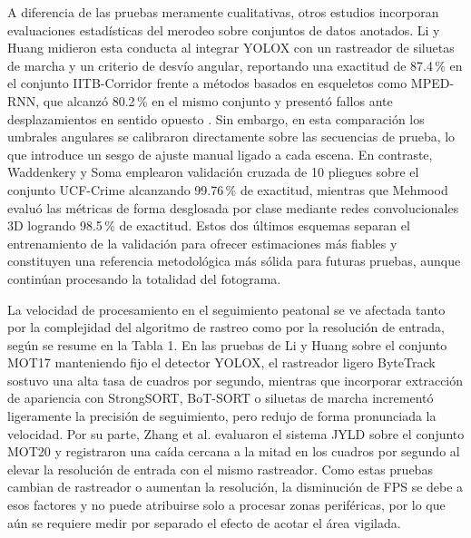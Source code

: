 \documentclass[runningheads]{llncs}
\begin{document}
A diferencia de las pruebas meramente cualitativas, otros estudios incorporan evaluaciones estadísticas del merodeo sobre conjuntos de datos anotados. Li y Huang \cite{li2024} midieron esta conducta al integrar YOLOX con un rastreador de siluetas de marcha y un criterio de desvío angular, reportando una exactitud de 87.4\,\% en el conjunto IITB-Corridor frente a métodos basados en esqueletos como MPED-RNN, que alcanzó 80.2\,\% en el mismo conjunto y presentó fallos ante desplazamientos en sentido opuesto \cite{jiang2022,li2024}. Sin embargo, en esta comparación los umbrales angulares se calibraron directamente sobre las secuencias de prueba, lo que introduce un sesgo de ajuste manual ligado a cada escena. En contraste, Waddenkery y Soma \cite{waddenkery2024} emplearon validación cruzada de 10 pliegues sobre el conjunto UCF-Crime alcanzando 99.76\,\% de exactitud, mientras que Mehmood \cite{mehmood2021} evaluó las métricas de forma desglosada por clase mediante redes convolucionales 3D logrando 98.5\,\% de exactitud. Estos dos últimos esquemas separan el entrenamiento de la validación para ofrecer estimaciones más fiables y constituyen una referencia metodológica más sólida para futuras pruebas, aunque continúan procesando la totalidad del fotograma.

La velocidad de procesamiento en el seguimiento peatonal se ve afectada tanto por la complejidad del algoritmo de rastreo como por la resolución de entrada, según se resume en la Tabla 1. En las pruebas de Li y Huang \cite{li2024} sobre el conjunto MOT17 manteniendo fijo el detector YOLOX, el rastreador ligero ByteTrack sostuvo una alta tasa de cuadros por segundo, mientras que incorporar extracción de apariencia con StrongSORT, BoT-SORT o siluetas de marcha incrementó ligeramente la precisión de seguimiento, pero redujo de forma pronunciada la velocidad. Por su parte, Zhang et al. \cite{zhang2023} evaluaron el sistema JYLD sobre el conjunto MOT20 y registraron una caída cercana a la mitad en los cuadros por segundo al elevar la resolución de entrada con el mismo rastreador. Como estas pruebas cambian de rastreador o aumentan la resolución, la disminución de FPS se debe a esos factores y no puede atribuirse solo a procesar zonas periféricas, por lo que aún se requiere medir por separado el efecto de acotar el área vigilada.
\end{document}
